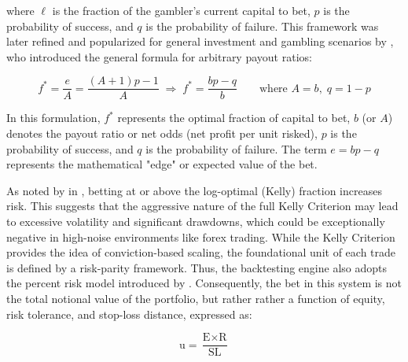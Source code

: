 \documentclass[12pt, a4paper]{article}
\begin{document}
where \( \ell \) is the fraction of the gambler's current capital to bet, \( p \) is the probability of success, and \( q \) is the probability of failure. 
This framework was later refined and popularized for general investment and gambling scenarios by \textcite[129]{thorp1984mathematics}, 
who introduced the general formula for arbitrary payout ratios:

\begin{equation}
    f^* = \frac{e}{A} = \frac{(A + 1)p - 1}{A}
    \;\Longrightarrow\;
    \boxed{f^* = \frac{bp - q}{b}}
    \qquad\text{where } A = b,\; q = 1-p
\end{equation}

In this formulation, \( f^* \) represents the optimal fraction of capital to bet, \( b \) (or \( A \)) denotes the payout ratio or net odds (net profit per unit risked), 
\( p \) is the probability of success, and \( q \) is the probability of failure. The term \( e = bp - q \) represents the mathematical "edge" or expected value of the bet.

As noted by \textcite[see][p. 876]{macLean2006capital} in \textcite{ziemba2007russell}, betting at or above the log-optimal (Kelly) fraction increases risk. 
This suggests that the aggressive nature of the full Kelly Criterion may lead to excessive volatility and significant drawdowns, 
which could be exceptionally negative in high-noise environments like forex trading.
While the Kelly Criterion provides the idea of conviction-based scaling, the foundational unit of each trade is defined by a risk-parity framework.
Thus, the backtesting engine also adopts the percent risk model introduced by \textcite[292f]{tharp1998trade}. Consequently, the bet in this system is not the total notional value of the portfolio, 
but rather rather a function of equity, risk tolerance, and stop-loss distance, expressed as:

\begin{equation}
    \text{u} = \frac{\text{E} \times \text{R}}{\text{SL}}
    \label{eq:pct_risk_model}
\end{equation}
\end{document}
